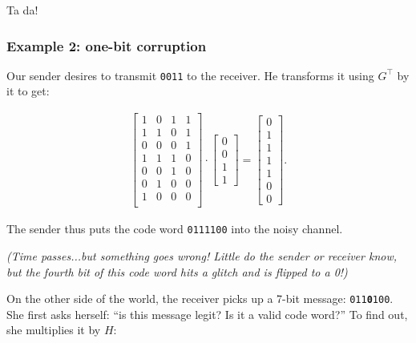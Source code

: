 \begin{alttitles}
Ta da!

\subsubsection{Example 2: one-bit corruption}

Our sender desires to transmit \texttt{0011} to the receiver.
He transforms it using $G^\intercal$ by it to get:

\vspace{-.15in}
\begin{align*}
\begin{bmatrix}
1 & 0 & 1 & 1\\
1 & 1 & 0 & 1\\
0 & 0 & 0 & 1\\
1 & 1 & 1 & 0\\
0 & 0 & 1 & 0\\
0 & 1 & 0 & 0\\
1 & 0 & 0 & 0\\
\end{bmatrix} \cdot
\begin{bmatrix}
0 \\ 0 \\ 1 \\ 1
\end{bmatrix} = 
\begin{bmatrix}
0 \\ 1 \\ 1 \\ 1 \\ 1 \\ 0 \\ 0
\end{bmatrix}.
\end{align*}
\vspace{-.15in}

The sender thus puts the code word \texttt{0111100} into the noisy channel.

\textit{(Time passes...but something goes wrong! Little do the sender or
receiver know, but the fourth bit of this code word hits a glitch and is
flipped to a 0!)}


On the other side of the world, the receiver picks up a 7-bit message:
\texttt{011\textbf{0}100}. She first asks herself: ``is this message legit? Is
it a valid code word?'' To find out, she multiplies it by $H$:


\end{alttitles}
